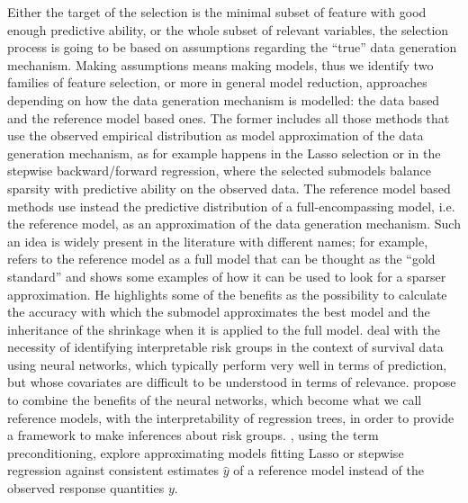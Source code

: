 \documentclass[american,]{article}
\theoremstyle{definition}
\begin{document}
Either the target of the selection is the minimal subset of feature with good enough predictive ability, or the whole subset of relevant variables, the selection process is going to be based on assumptions regarding the ``true'' data generation mechanism. Making assumptions means making models, thus we identify two families of feature selection, or more in general model reduction, approaches depending on how the data generation mechanism is modelled: the data based and the reference model based ones. The former includes all those methods that use the observed empirical distribution as model approximation of the data generation mechanism, as for example happens in the Lasso selection \cite{paper:tibshirani_lasso} or in the stepwise backward/forward regression, where the selected submodels balance sparsity with predictive ability on the observed data. The reference model based methods use instead the predictive distribution of a full-encompassing model, i.e. the reference model, as an approximation of the data generation mechanism. Such an idea is widely present in the literature with different names; for example, \cite{book:harrell} refers to the reference model as a full model that can be thought as the ``gold standard'' and shows some examples of how it can be used to look for a sparser approximation. He highlights some of the benefits as the possibility to calculate the accuracy with which the submodel approximates the best model and the inheritance of the shrinkage when it is applied to the full model. \cite{paper:faraggi_nn} deal with the necessity of identifying interpretable risk groups in the context of survival data using neural networks, which typically perform very well in terms of prediction, but whose covariates are difficult to be understood in terms of relevance. \cite{paper:faraggi_nn} propose to combine the benefits of the neural networks, which become what we call reference models, with the interpretability of regression trees, in order to provide a framework to make inferences about risk groups. \cite{paper:paul_preconditioning}, using the term preconditioning, explore approximating models fitting Lasso or stepwise regression against consistent estimates $\hat{y}$ of a reference model instead of the observed response quantities $y$. 
\\
\end{document}
